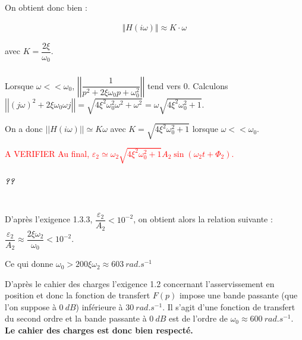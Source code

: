 \documentclass[10pt,fleqn]{article} %
\begin{document}
On obtient donc bien : 

\begin{align*}
\Vert H(i\omega)\Vert\approx K\cdot \omega
\end{align*}

avec $K=\dfrac{2\xi}{\omega_0}$.

\subparagraph{}	
Lorsque $\omega << \omega_0$, $\left|\left|  \dfrac{1}{p^2+2\xi\omega_0 p + \omega_0^2} \right|\right|$ tend vers 0. Calculons $\left|\left|  \left( j \omega \right) ^2+2\xi\omega_0  \omega j  \right|\right| =\sqrt{4\xi^2\omega_0^2 \omega^2 + \omega^2} =\omega \sqrt{4\xi^2\omega_0^2  + 1}$. 

On a donc $|| H\left( i\omega\right)|| \simeq K\omega $ avec $K=\sqrt{4\xi^2\omega_0^2  + 1}$ lorsque $\omega << \omega_0$.

\textcolor{red}{A VERIFIER Au final, $\varepsilon_2 \simeq \omega_2 \sqrt{4\xi^2\omega_0^2  + 1} A_2\sin \left(\omega_2 t + \Phi_2 \right) $.}

\subparagraph{??}	~\\

D'après l'exigence 1.3.3, $\dfrac{\varepsilon_2}{A_2}<10^{-2}$, on obtient alors la relation suivante : $
\dfrac{\varepsilon_2}{A_2}\approx \dfrac{2\xi\omega_2}{\omega_0}<10^{-2}$. 

Ce qui donne $
\omega_0>200\xi\omega_2\approx \SI{603}{rad.s^{-1}}$

D'après le cahier des charges l'exigence 1.2 concernant l'asservissement en position et donc la fonction de transfert $F(p)$ impose une bande passante (que l'on suppose à $\SI{0}{dB}$) inférieure à $\SI{30}{rad.s^{-1}}$. Il s'agit d'une fonction de transfert du second ordre et la bande passante à $\SI{0}{dB}$ est de l'ordre de $\omega_0\approx \SI{600}{rad.s^{-1}}$. \textbf{Le cahier des charges est donc bien respecté.}



\end{document}

